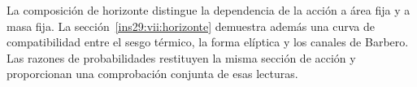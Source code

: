 La composición de horizonte distingue la dependencia de la acción a área
fija y a masa fija. La sección~\ref{ins29:vii:horizonte} demuestra además
una curva de compatibilidad entre el sesgo térmico, la forma elíptica y los
canales de Barbero. Las razones de probabilidades restituyen la misma
sección de acción y proporcionan una comprobación conjunta de esas lecturas.

